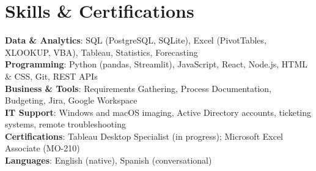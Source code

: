\documentclass[letterpaper,11pt]{article}
\begin{document}
\section{Skills \& Certifications}
 \begin{itemize}[leftmargin=0.15in, label={}]
    \small{\item{
     \textbf{Data \& Analytics}{: SQL (PostgreSQL, SQLite), Excel (PivotTables, XLOOKUP, VBA), Tableau, Statistics, Forecasting} \\
     \textbf{Programming}{: Python (pandas, Streamlit), JavaScript, React, Node.js, HTML \& CSS, Git, REST APIs} \\
     \textbf{Business \& Tools}{: Requirements Gathering, Process Documentation, Budgeting, Jira, Google Workspace} \\
     \textbf{IT Support}{: Windows and macOS imaging, Active Directory accounts, ticketing systems, remote troubleshooting} \\
     \textbf{Certifications}{: Tableau Desktop Specialist (in progress); Microsoft Excel Associate (MO-210)} \\
     \textbf{Languages}{: English (native), Spanish (conversational)}
    }}
 \end{itemize}

\end{document}
